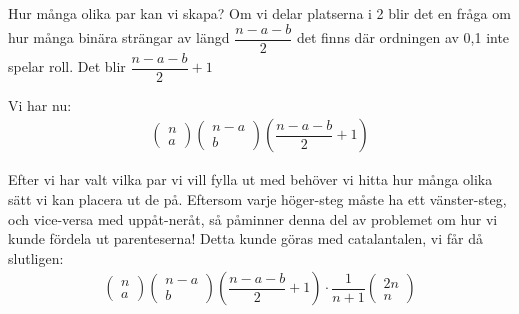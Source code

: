 \documentclass{tufte-handout}
\begin{document}
\begin{ans}
  \noindent Hur många olika par kan vi skapa? Om vi delar platserna i 2 blir det en fråga om hur många binära strängar av längd $\dfrac{n-a-b}{2}$ det finns där ordningen av 0,1 inte spelar roll. Det blir $\dfrac{n-a-b}{2}+1$
  \par\bigskip
  \noindent Vi har nu:
  \begin{equation*}
    \begin{gathered}
      \begin{pmatrix}n\\a\end{pmatrix}\begin{pmatrix}n-a\\b\end{pmatrix}\left(\dfrac{n-a-b}{2}+1\right)
    \end{gathered}
  \end{equation*}
  \par\bigskip
  \noindent Efter vi har valt vilka par vi vill fylla ut med behöver vi hitta hur många olika sätt vi kan placera ut de på. Eftersom varje höger-steg måste ha ett vänster-steg, och vice-versa med uppåt-neråt, så påminner denna del av problemet om hur vi kunde fördela ut parenteserna! Detta kunde göras med catalantalen, vi får då slutligen:
  \begin{equation*}
    \begin{gathered}
      \begin{pmatrix}n\\a\end{pmatrix}\begin{pmatrix}n-a\\b\end{pmatrix}\left(\dfrac{n-a-b}{2}+1\right)\cdot\dfrac{1}{n+1}\begin{pmatrix}2n\\n\end{pmatrix}
    \end{gathered}
  \end{equation*}
\end{ans}
\end{document}
